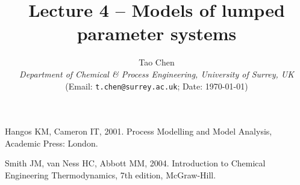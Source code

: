 \documentclass[a4paper,11pt]{article}
\title{\vspace{-2cm} Lecture 4 -- Models of lumped parameter systems}
\author{Tao Chen\\
{\small \emph{Department of Chemical \& Process Engineering, University of Surrey, UK}}\\
{\small (Email: \texttt{t.chen@surrey.ac.uk}; \hspace{0.5cm} Date: \today )}
}
\date{}
\theoremstyle{definition}
\begin{document}
\maketitle

\vspace{-0.5cm}




\begin{thebibliography}{2}
\vspace{-0.4cm}
	Hangos KM, Cameron IT, 2001. Process Modelling and Model Analysis, Academic Press: London.

	Smith JM, van Ness HC, Abbott MM, 2004. Introduction to Chemical Engineering Thermodynamics, 7th edition, McGraw-Hill.
\end{thebibliography}
\end{document}
